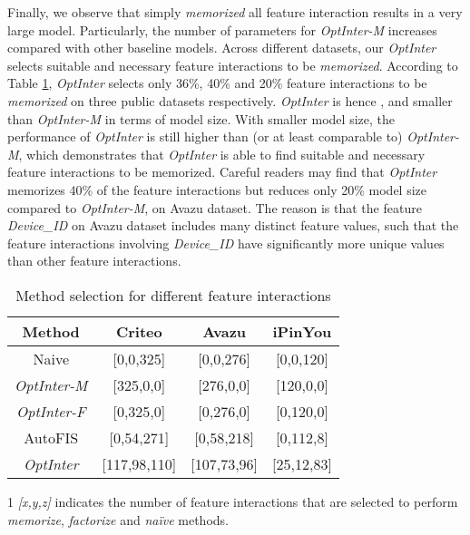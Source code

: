\documentclass[conference]{IEEEtran}
\begin{document}
Finally, we observe that simply \emph{memorized} all feature interaction results in a very large model. Particularly, the number of parameters for \textit{OptInter-M} increases  compared with other baseline models. Across different datasets, our \emph{OptInter} selects suitable and necessary feature interactions to be \emph{memorized}. 
According to Table \ref{Table:arch}, \emph{OptInter} selects only 36\%, 40\% and 20\% feature interactions to be \emph{memorized} on three public datasets respectively. \textit{OptInter} is hence ,  and  smaller than \textit{OptInter-M} in terms of model size. With smaller model size, the performance of \textit{OptInter} is still higher than (or at least comparable to) \textit{OptInter-M}, which demonstrates that \textit{OptInter} is able to find suitable and necessary feature interactions to be memorized. Careful readers may find that \textit{OptInter} memorizes 40\% of the feature interactions but reduces only 20\% model size compared to  \textit{OptInter-M}, on Avazu dataset. The reason is that the feature \textit{Device\_ID} on Avazu dataset includes many distinct feature values, such that the feature interactions involving \textit{Device\_ID} have significantly more unique values than other feature interactions.

\begin{table}[!htbp]
    \renewcommand\arraystretch{1.00}
	\centering
	\caption{Method selection for different feature interactions}
	\begin{tabular}{c|ccc}
		\hline
		  Method & Criteo & Avazu & iPinYou \\
		\hline
		  Naive & [0,0,325] & [0,0,276] & [0,0,120] \\
		  \textit{OptInter-M} & [325,0,0] & [276,0,0] & [120,0,0] \\
		  \textit{OptInter-F} & [0,325,0] & [0,276,0] & [0,120,0] \\ 
		  AutoFIS & [0,54,271] & [0,58,218] & [0,112,8]\\
		  \textit{OptInter} & [117,98,110] & [107,73,96] & [25,12,83] \\
		\hline
	\end{tabular}
	\begin{tablenotes}
    \footnotesize
    \item[1] \textit{[x,y,z]} indicates the number of feature interactions that are selected to perform \emph{memorize}, \emph{factorize} and \emph{naïve} methods. 
    \end{tablenotes}
	\label{Table:arch}
\end{table}
\end{document}
